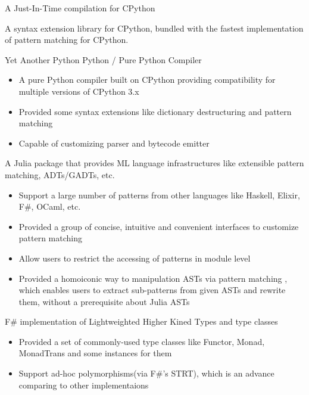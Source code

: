 \documentclass{resume}
\begin{document}
A Just-In-Time compilation for CPython

A syntax extension library for CPython, bundled with the fastest implementation of pattern matching for CPython.

Yet Another Python Python / Pure Python Compiler
\begin{itemize}
  \item A pure Python compiler built on CPython providing compatibility for multiple versions of CPython 3.x
  \item Provided some syntax extensions like dictionary destructuring and pattern matching
  \item Capable of customizing parser and bytecode emitter
\end{itemize}

A Julia package that provides ML language infrastructures like extensible pattern matching, ADTs/GADTs, etc.
\begin{itemize}
  \item Support a large number of patterns from other languages like Haskell, Elixir, F\#, OCaml, etc.
  \item Provided a group of concise, intuitive and convenient interfaces to customize pattern matching
  \item Allow users to restrict the accessing of patterns in module level
  \item Provided a homoiconic way to manipulation ASTs via pattern matching
        , which enables users to extract sub-patterns from given ASTs and rewrite them, without a prerequisite
  about Julia ASTs
\end{itemize}

F\# implementation of Lightweighted Higher Kined Types and type classes
\begin{itemize}
 \item Provided a set of commonly-used type classes like Functor, Monad, MonadTrans and some instances for them
 \item Support ad-hoc polymorphisms(via F\#'s STRT), which is an advance comparing to other implementaions
\end{itemize}
\end{document}
